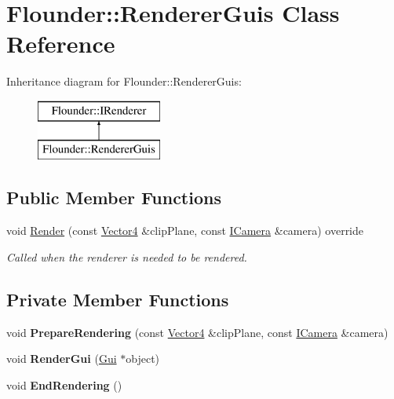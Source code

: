 \hypertarget{class_flounder_1_1_renderer_guis}{}\section{Flounder\+:\+:Renderer\+Guis Class Reference}
\label{class_flounder_1_1_renderer_guis}
Inheritance diagram for Flounder\+:\+:Renderer\+Guis\+:\begin{figure}[H]
\begin{center}
\leavevmode
\includegraphics[height=2.000000cm]{class_flounder_1_1_renderer_guis}
\end{center}
\end{figure}
\subsection*{Public Member Functions}
\begin{DoxyCompactItemize}
\item 
void \hyperlink{class_flounder_1_1_renderer_guis_ad408b843ad27594ab940c11659b2e619}{Render} (const \hyperlink{class_flounder_1_1_vector4}{Vector4} \&clip\+Plane, const \hyperlink{class_flounder_1_1_i_camera}{I\+Camera} \&camera) override
\begin{DoxyCompactList}\small\item\em Called when the renderer is needed to be rendered. \end{DoxyCompactList}\end{DoxyCompactItemize}
\subsection*{Private Member Functions}
\begin{DoxyCompactItemize}
\item 
\mbox{\label{class_flounder_1_1_renderer_guis_a0628ef4667d25853443b48ba2ad11668}} 
void {\bfseries Prepare\+Rendering} (const \hyperlink{class_flounder_1_1_vector4}{Vector4} \&clip\+Plane, const \hyperlink{class_flounder_1_1_i_camera}{I\+Camera} \&camera)
\item 
\mbox{\label{class_flounder_1_1_renderer_guis_a35f09c4e8e9971d9f0138337e6a1d0a6}} 
void {\bfseries Render\+Gui} (\hyperlink{class_flounder_1_1_gui}{Gui} $\ast$object)
\item 
\mbox{\label{class_flounder_1_1_renderer_guis_a6fda700e65323e1e05bab57da1582914}} 
void {\bfseries End\+Rendering} ()
\end{DoxyCompactItemize}
